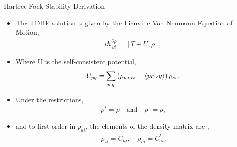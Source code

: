 \documentclass[10pt]{beamer}
\begin{document}
{{{{{{{{{{{{{{{%
\begin{frame}{Hartree-Fock Stability Derivation}
	\begin{itemize}[<+->]
		\item[]{The TDHF solution is given by the Liouville Von-Neumann Equation of Motion,
			\begin{eqnarray}
				i\hbar\frac{\partial \rho}{\partial t} = \left[ T+U, \rho \right],
			\end{eqnarray}
		}
		\item[]{Where U is the self-consistent potential,
			\begin{eqnarray}
				U_{pq} = \sum\limits_{p,q} \left(\rho_{pq,rs} - \braket{pr|sq} \right) \rho_{sr}.
			\end{eqnarray}
		}
		\item[]{Under the restrictions,
			\begin{eqnarray}
				\rho^2 = \rho \quad \textrm{and} \quad \rho^{\dagger} = \rho,
			\end{eqnarray}
		}
		\item[]{and to first order in $\rho_{ai}$, the elements of the density matrix are ,
			\begin{eqnarray}
				\rho_{ai} = C_{ai}, \quad \rho_{ia} = C_{ai}^*.
			\end{eqnarray}
		}
	\end{itemize}
\end{frame}

{%

}}}}}}}}}}}}}}}}
\end{document}
